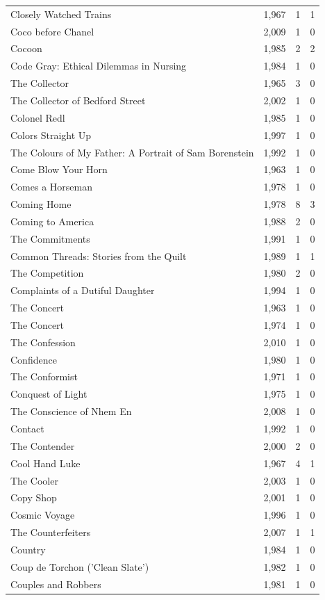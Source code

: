 \begin{tabular}{lrrr}
Closely Watched Trains & 1,967 & 1 & 1 \\
Coco before Chanel & 2,009 & 1 & 0 \\
Cocoon & 1,985 & 2 & 2 \\
Code Gray: Ethical Dilemmas in Nursing & 1,984 & 1 & 0 \\
The Collector & 1,965 & 3 & 0 \\
The Collector of Bedford Street & 2,002 & 1 & 0 \\
Colonel Redl & 1,985 & 1 & 0 \\
Colors Straight Up & 1,997 & 1 & 0 \\
The Colours of My Father: A Portrait of Sam Borenstein & 1,992 & 1 & 0 \\
Come Blow Your Horn & 1,963 & 1 & 0 \\
Comes a Horseman & 1,978 & 1 & 0 \\
Coming Home & 1,978 & 8 & 3 \\
Coming to America & 1,988 & 2 & 0 \\
The Commitments & 1,991 & 1 & 0 \\
Common Threads: Stories from the Quilt & 1,989 & 1 & 1 \\
The Competition & 1,980 & 2 & 0 \\
Complaints of a Dutiful Daughter & 1,994 & 1 & 0 \\
The Concert & 1,963 & 1 & 0 \\
The Concert & 1,974 & 1 & 0 \\
The Confession & 2,010 & 1 & 0 \\
Confidence & 1,980 & 1 & 0 \\
The Conformist & 1,971 & 1 & 0 \\
Conquest of Light & 1,975 & 1 & 0 \\
The Conscience of Nhem En & 2,008 & 1 & 0 \\
Contact & 1,992 & 1 & 0 \\
The Contender & 2,000 & 2 & 0 \\
Cool Hand Luke & 1,967 & 4 & 1 \\
The Cooler & 2,003 & 1 & 0 \\
Copy Shop & 2,001 & 1 & 0 \\
Cosmic Voyage & 1,996 & 1 & 0 \\
The Counterfeiters & 2,007 & 1 & 1 \\
Country & 1,984 & 1 & 0 \\
Coup de Torchon ('Clean Slate') & 1,982 & 1 & 0 \\
Couples and Robbers & 1,981 & 1 & 0 \\

\end{tabular}
